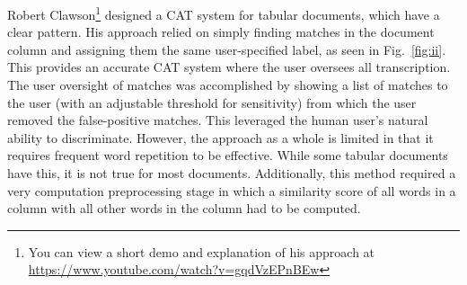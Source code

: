 \documentclass[ms]{byuprop}
\begin{document}
Robert Clawson\cite{Clawson2014}\footnote{You can view a short demo and explanation of his approach at \url{https://www.youtube.com/watch?v=gqdVzEPnBEw}} designed a CAT system for tabular documents, which have a clear pattern. His approach relied on simply finding matches in the document column and assigning them the same user-specified label, as seen in Fig.~\ref{fig:ii}. This provides an accurate CAT system where the user oversees all transcription. The user oversight of matches was accomplished by showing a list of matches to the user (with an adjustable threshold for sensitivity) from which the user removed the false-positive matches. This leveraged the human user's natural ability to discriminate. However, the approach as a whole is limited in that it requires frequent word repetition to be effective. While some tabular documents have this, it is not true for most documents. Additionally, this method required a very computation preprocessing stage in which a similarity score of all words in a column with all other words in the column had to be computed.
\end{document}
